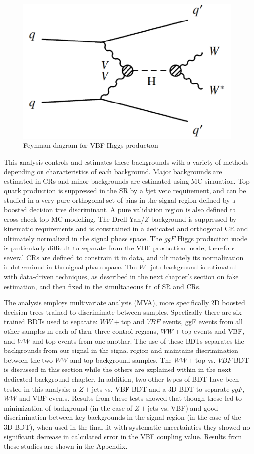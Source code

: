 \begin{figure}[!htbp]
    \centering
    \includegraphics[width=0.2\linewidth]{Pictures/fig_01b_2.pdf}
    \caption{Feynman diagram for VBF Higgs production}
    \label{fig:FeynmanDiagram}
\end{figure}

This analysis controls and estimates these backgrounds with a variety of methods depending on characteristics of each background. Major backgrounds are estimated in CRs and minor backgrounds are estimated using MC simuation. Top quark production is suppressed in the SR by a $b$jet veto requirement, and can be studied in a very pure orthogonal set of bins in the signal region defined by a boosted decision tree discriminant. A pure validation region is also defined to cross-check top MC modelling. The Drell-Yan/$Z$ background is suppressed by kinematic requirements and is constrained in a dedicated and orthogonal CR and ultimately normalized in the signal phase space. The $ggF$ Higgs produciton mode is particularly difficult to separate from the VBF production mode, therefore several CRs are defined to constrain it in data, and ultimately its normalization is determined in the signal phase space. The $W$+jets background is estimated with data-driven techniques, as described in the next chapter's section on fake estimation, and then fixed in the simultaneous fit of SR and CRs.

The analysis employs multivariate analysis (MVA), more specifically 2D boosted decision trees trained to discriminate between samples. Specfically there are six trained BDTs used to separate: $WW+$top and $VBF$ events, ggF events from all other samples in each of their three control regions, $WW+$top events and VBF, and $WW$ and top events from one another. The use of these BDTs separates the backgrounds from our signal in the signal region and maintains discrimination between the two $WW$ and top background samples. The  $WW+$top vs. $VBF$ BDT is discussed in this section while the others are explained within in the next dedicated background chapter. In addition, two other types of BDT have been tested in this analysis: a $Z+$jets vs. VBF BDT and a 3D BDT to separate $ggF$, $WW$ and VBF events. Results from these tests showed that though these led to minimization of background (in the case of $Z+$jets vs. VBF) and good discrimination between key backgrounds in the signal region (in the case of the 3D BDT), when used in the final fit with systematic uncertainties they showed no significant decrease in calculated error in the VBF coupling value. Results from these studies are shown in the Appendix. 

